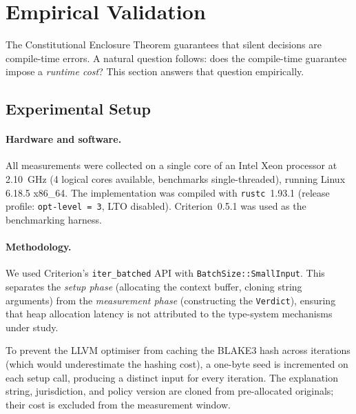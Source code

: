 %

\section{Empirical Validation}
\label{sec:benchmarks}

The Constitutional Enclosure Theorem guarantees that silent decisions
are compile-time errors.  A natural question follows: does the
compile-time guarantee impose a \emph{runtime cost}?  This section
answers that question empirically.

\subsection{Experimental Setup}
\label{sec:setup}

\paragraph{Hardware and software.}
All measurements were collected on a single core of an
Intel Xeon processor at 2.10~GHz (4 logical cores available, benchmarks
single-threaded), running Linux 6.18.5 x86\_64.
The implementation was compiled with \texttt{rustc}~1.93.1
(release profile: \texttt{opt-level~=~3}, LTO disabled).
Criterion~0.5.1 was used as the benchmarking harness.

\paragraph{Methodology.}
We used Criterion's \texttt{iter\_batched} API with
\texttt{BatchSize::SmallInput}.  This separates the \emph{setup
phase} (allocating the context buffer, cloning string arguments) from
the \emph{measurement phase} (constructing the \texttt{Verdict}),
ensuring that heap allocation latency is not attributed to the
type-system mechanisms under study.

To prevent the LLVM optimiser from caching the BLAKE3 hash across
iterations (which would underestimate the hashing cost), a one-byte
seed is incremented on each setup call, producing a distinct input
for every iteration.  The explanation string, jurisdiction, and
policy version are cloned from pre-allocated originals; their cost
is excluded from the measurement window.

